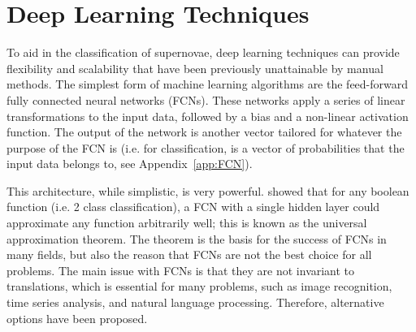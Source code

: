\chapter{Deep Learning Techniques}
\label{chap:MLTechniques}

To aid in the classification of supernovae, deep learning techniques can provide 
flexibility and scalability that have been previously unattainable by manual 
methods. The simplest form of machine learning algorithms are the feed-forward 
fully connected neural networks (FCNs). These networks apply a series of linear 
transformations to the input data, followed by a bias and a non-linear activation 
function. The output of the network is another vector tailored for whatever the 
purpose of the FCN is (i.e. for classification, is a vector of probabilities 
that the input data belongs to, see Appendix~\ref{app:FCN}). 

This architecture, while simplistic, is very powerful. \textcite{cybenko1989} showed that for any boolean 
function (i.e. 2 class classification), a FCN with a single hidden layer could 
approximate any function arbitrarily well; this is known as the universal approximation
theorem. The theorem is the basis for the success of FCNs in
many fields, but also the reason that FCNs are not the best choice for all problems.
The main issue with FCNs is that they are not invariant to translations, which is 
essential for many problems, such as image recognition, time series analysis, and 
natural language processing. Therefore, alternative options have been proposed. 

